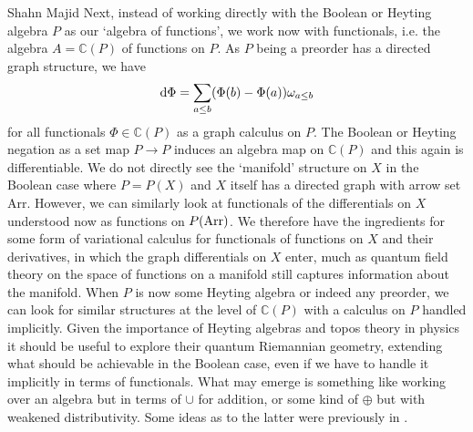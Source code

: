 \begin{artengenv}{Shahn Majid}
Next, instead of working directly with the Boolean or Heyting algebra $P$ as our `algebra of functions', we work now with functionals, i.e. the algebra $A=\mathbb{C}(P)$ of functions on $P$. As $P$ being a preorder has a directed graph structure, we have
\[ {\rm d} \Phi= \sum_{a\le b} (\Phi(b)-\Phi(a))\omega_{a\le b}\]
for all functionals $\Phi\in \mathbb{C}(P)$ as a graph calculus on $P$. The Boolean or Heyting negation as a set map $P\to P$ induces an algebra map on $\mathbb{C}(P)$ and this again is differentiable. We do not directly see the `manifold' structure on $X$ in the Boolean case where $P=P(X)$ and $X$ itself has a directed graph with arrow set {\rm Arr}. However, we can similarly look at functionals of the differentials on $X$ understood now as functions on $P({\rm Arr})$. We therefore have the ingredients for some form of variational calculus for functionals of functions on $X$ and their derivatives, in which the graph differentials on $X$ enter, much as quantum field theory on the space of functions on a manifold still captures information about the manifold. When $P$ is now some Heyting algebra or indeed any preorder, we can look for similar structures at the level of $\mathbb{C}(P)$ with a calculus on $P$ handled implicitly. Given the importance of Heyting algebras and topos theory in physics  \parencite[see e.g.][]{DorIsh} it should be useful to explore their quantum Riemannian geometry, extending what should be achievable in the Boolean case, even if we have to handle it implicitly in terms of functionals. What may emerge is something like working over an algebra but in terms of $\cup$ for addition, or some kind of $\oplus$ but with weakened distributivity. Some ideas as to the latter were previously in \parencite[Sec.~7]{Ma:sel}. 


\end{artengenv}

